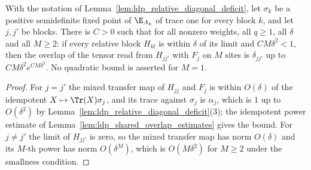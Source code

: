 \begin{lemma}
    \label{lem:ldp_relative_overlaps_second_order}
    \leanok
    With the notation of Lemma~\ref{lem:ldp_relative_diagonal_deficit}, let $\sigma_k$ be a
    positive semidefinite fixed point of $\E_{A_k}$ of trace one for every block $k$, and
    let $j,j'$ be blocks. There is $C>0$ such that for all nonzero weights, all $q\geq1$,
    all $\delta$ and all $M\geq2$: if every relative block $H_{kl}$ is within $\delta$ of
    its limit and $CM\delta^2<1$, then the overlap of the tensor read from $H_{jj'}$ with
    $F_j$ on $M$ sites is $\delta_{jj'}$ up to $CM\delta^2e^{CM\delta^2}$. No quadratic
    bound is asserted for $M=1$.
\end{lemma}
\begin{proof}
    \leanok
    For $j=j'$ the mixed transfer map of $H_{jj}$ and $F_j$ is within $O(\delta)$ of the
    idempotent $X\mapsto\Tr(X)\sigma_j$, and its trace against $\sigma_j$ is $\alpha_j$,
    which is $1$ up to $O(\delta^2)$ by
    Lemma~\ref{lem:ldp_relative_diagonal_deficit}(3); the idempotent power estimate of
    Lemma~\ref{lem:ldp_shared_overlap_estimates} gives the bound. For $j\neq j'$ the
    limit of $H_{jj'}$ is zero, so the mixed transfer map has norm $O(\delta)$ and its
    $M$-th power has norm $O(\delta^M)$, which is $O(M\delta^2)$ for $M\geq2$ under the
    smallness condition.
\end{proof}

